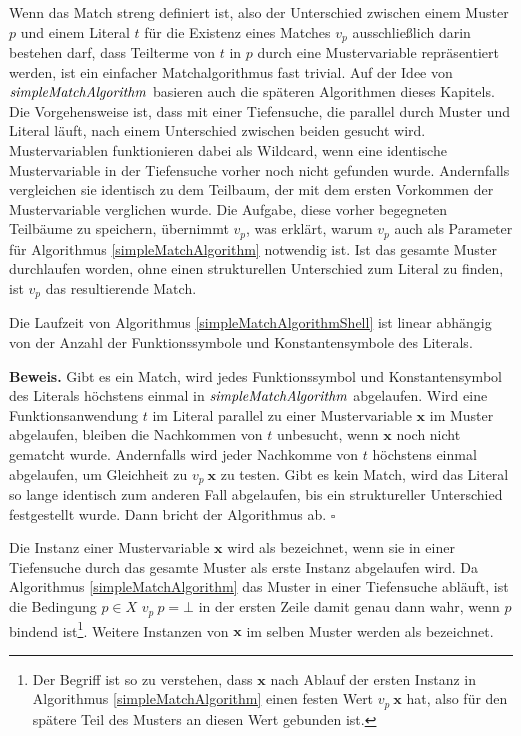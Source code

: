 Wenn das Match streng definiert ist, also der Unterschied zwischen einem Muster $p$ und einem Literal $t$ für die Existenz eines Matches $v_p$ ausschließlich darin bestehen darf, dass Teilterme von $t$ in $p$ durch eine Mustervariable repräsentiert werden, ist ein einfacher Matchalgorithmus fast trivial. Auf der Idee von $\mathit{simpleMatchAlgorithm}$ basieren auch die späteren Algorithmen dieses Kapitels. Die Vorgehensweise ist, dass mit einer Tiefensuche, die parallel durch Muster und Literal läuft, nach einem Unterschied zwischen beiden gesucht wird. Mustervariablen funktionieren dabei als Wildcard, wenn eine identische Mustervariable in der Tiefensuche vorher noch nicht gefunden wurde. Andernfalls vergleichen sie identisch zu dem Teilbaum, der mit dem ersten Vorkommen der Mustervariable verglichen wurde. Die Aufgabe, diese vorher begegneten Teilbäume zu speichern, übernimmt $v_p$, was erklärt, warum $v_p$ auch als Parameter für Algorithmus \ref{simpleMatchAlgorithm} notwendig ist. Ist das gesamte Muster durchlaufen worden, ohne einen strukturellen Unterschied zum Literal zu finden, ist $v_p$ das resultierende Match.\\

\begin{lemma}
Die Laufzeit von Algorithmus \ref{simpleMatchAlgorithmShell} ist linear abhängig von der Anzahl der Funktionssymbole und Konstantensymbole des Literals.
\end{lemma}

\textbf{Beweis.}
Gibt es ein Match, wird jedes Funktionssymbol und Konstantensymbol des Literals höchstens einmal in $\mathit{simpleMatchAlgorithm}$ abgelaufen. Wird eine Funktionsanwendung $t$ im Literal parallel zu einer Mustervariable $\mathbf x$ im Muster abgelaufen, bleiben die Nachkommen von $t$ unbesucht, wenn $\mathbf x$ noch nicht gematcht wurde. Andernfalls wird jeder Nachkomme von $t$ höchstens einmal abgelaufen, um Gleichheit zu $v_p~\mathbf x$ zu testen.
Gibt es kein Match, wird das Literal so lange identisch zum anderen Fall abgelaufen, bis ein struktureller Unterschied festgestellt wurde. Dann bricht der Algorithmus ab.
\hfill $\square$\\


\begin{definition}
Die Instanz einer Mustervariable $\mathbf x$ wird als   bezeichnet, wenn sie in einer Tiefensuche durch das gesamte Muster als erste Instanz abgelaufen wird. Da Algorithmus \ref{simpleMatchAlgorithm} das Muster in einer Tiefensuche abläuft, ist die Bedingung $p \in X$ \KwAnd $v_p~p = \bot$ in der ersten Zeile damit genau dann wahr, wenn $p$ bindend ist\footnote{Der Begriff  ist so zu verstehen, dass $\mathbf x$ nach Ablauf der ersten Instanz in Algorithmus \ref{simpleMatchAlgorithm} einen festen Wert $v_p~\mathbf x$ hat, also für den spätere Teil des Musters an diesen Wert gebunden ist.}. Weitere Instanzen von $\mathbf x$ im selben Muster werden als  bezeichnet.
\end{definition}



